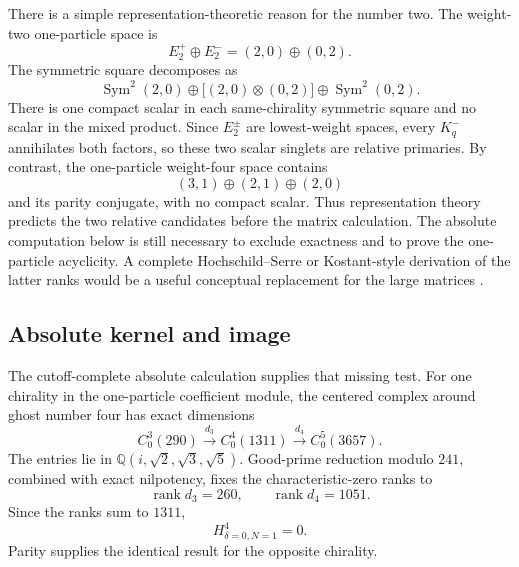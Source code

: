 \documentclass[11pt]{article}
\theoremstyle{definition}
\theoremstyle{remark}
\newcommand{\rank}{\operatorname{rank}}
\begin{document}
There is a simple representation-theoretic reason for the number two.  The
weight-two one-particle space is
\begin{equation}
 E_2^+\oplus E_2^-=(2,0)\oplus(0,2).
\end{equation}
The symmetric square decomposes as
\begin{equation}
 \operatorname{Sym}^2(2,0)
 \oplus\bigl[(2,0)\otimes(0,2)\bigr]
 \oplus\operatorname{Sym}^2(0,2).
\end{equation}
There is one compact scalar in each same-chirality symmetric square and no
scalar in the mixed product.  Since $E_2^\pm$ are lowest-weight spaces,
every $K^-_q$ annihilates both factors, so these two scalar singlets are
relative primaries.  By contrast, the one-particle weight-four space
contains
\begin{equation}
 (3,1)\oplus(2,1)\oplus(2,0)
\end{equation}
and its parity conjugate, with no compact scalar.  Thus representation
theory predicts the two relative candidates before the matrix calculation.
The absolute computation below is still necessary to exclude exactness and
to prove the one-particle acyclicity.  A complete Hochschild--Serre or
Kostant-style derivation of the latter ranks would be a useful conceptual
replacement for the large matrices \cite{CapBGG}.

\subsection{Absolute kernel and image}

The cutoff-complete absolute calculation supplies that missing test.  For
one chirality in the one-particle coefficient module, the centered complex
around ghost number four has exact dimensions
\begin{equation}\label{eq:one-particle-complex}
 C^3_0(290)\xrightarrow{d_3}
 C^4_0(1311)\xrightarrow{d_4}
 C^5_0(3657).
\end{equation}
The entries lie in
$\mathbb Q(i,\sqrt2,\sqrt3,\sqrt5)$.  Good-prime reduction modulo $241$,
combined with exact nilpotency, fixes the characteristic-zero ranks to
\begin{equation}
 \rank d_3=260,
 \qquad \rank d_4=1051.
\end{equation}
Since the ranks sum to $1311$,
\begin{equation}\label{eq:one-particle-zero}
 H^4_{\delta=0,N=1}=0.
\end{equation}
Parity supplies the identical result for the opposite chirality.
\end{document}
